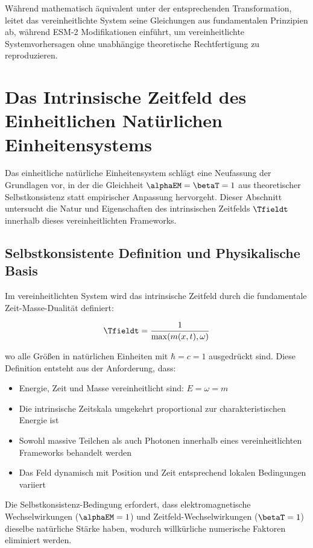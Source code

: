 	Während mathematisch äquivalent unter der entsprechenden Transformation, leitet das vereinheitlichte System seine Gleichungen aus fundamentalen Prinzipien ab, während ESM-2 Modifikationen einführt, um vereinheitlichte Systemvorhersagen ohne unabhängige theoretische Rechtfertigung zu reproduzieren.
	
	\section{Das Intrinsische Zeitfeld des Einheitlichen Natürlichen Einheitensystems}
	\label{sec:unified_time_field}
	
	Das einheitliche natürliche Einheitensystem schlägt eine Neufassung der Grundlagen vor, in der die Gleichheit $\alphaEM = \betaT = 1$ aus theoretischer Selbstkonsistenz statt empirischer Anpassung hervorgeht. Dieser Abschnitt untersucht die Natur und Eigenschaften des intrinsischen Zeitfelds $\Tfieldt$ innerhalb dieses vereinheitlichten Frameworks.
	
	\subsection{Selbstkonsistente Definition und Physikalische Basis}
	\label{subsec:self_consistent_definition}
	
	Im vereinheitlichten System wird das intrinsische Zeitfeld durch die fundamentale Zeit-Masse-Dualität definiert:
	
	\begin{equation}
		\Tfieldt = \frac{1}{\max(m(x,t), \omega)}
	\end{equation}
	
	wo alle Größen in natürlichen Einheiten mit $\hbar = c = 1$ ausgedrückt sind. Diese Definition entsteht aus der Anforderung, dass:
	
	\begin{itemize}
		\item Energie, Zeit und Masse vereinheitlicht sind: $E = \omega = m$
		\item Die intrinsische Zeitskala umgekehrt proportional zur charakteristischen Energie ist
		\item Sowohl massive Teilchen als auch Photonen innerhalb eines vereinheitlichten Frameworks behandelt werden
		\item Das Feld dynamisch mit Position und Zeit entsprechend lokalen Bedingungen variiert
	\end{itemize}
	
	Die Selbstkonsistenz-Bedingung erfordert, dass elektromagnetische Wechselwirkungen ($\alphaEM = 1$) und Zeitfeld-Wechselwirkungen ($\betaT = 1$) dieselbe natürliche Stärke haben, wodurch willkürliche numerische Faktoren eliminiert werden.
	
